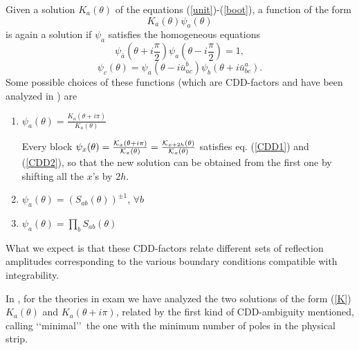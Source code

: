 \documentclass[a4paper,12pt]{report}
\begin{document}
\vspace{0.5cm}

Given a solution $K_{a}(\theta)$ of the equations (\ref{unit})-(\ref{boot}), a function of the form
\begin{equation}
K_{a}(\theta)\psi_{a}(\theta)
\end{equation}
is again a solution if $\psi_{a}$ satisfies the homogeneous equations
\begin{equation}\label{CDD1}
\psi_{\bar{a}}(\theta+i\frac{\pi}{2})\psi_{a}(\theta-i\frac{\pi}{2})=1,
\end{equation}
\begin{equation}\label{CDD2}
\psi_{c}(\theta)=\psi_{a}(\theta-i\bar{u}_{ac}^{b})\psi_{b}(\theta+i\bar{u}_{bc}^{a}).
\end{equation}
Some possible choices of these functions (which are CDD-factors and have been analyzed in \cite{sas}) are

\begin{enumerate}

\item {$\psi_{a}(\theta)=\frac{K_{a}(\theta+i\pi)}{K_{a}(\theta)}$}

Every block $\psi_{x}(\theta)=\frac{{\cal K}_{x}(\theta+i\pi)}{{\cal K}_{x}(\theta)}=\frac{{\cal
K}_{x+2h}(\theta)}{{\cal K}_{x}(\theta)}$ satisfies eq. (\ref{CDD1}) and (\ref{CDD2}), so that the new solution
can be obtained from the first one by shifting all the $x$'s by $2h$.


\item {$\psi_{a}(\theta)=\left(S_{ab}(\theta)\right)^{\pm 1}$, $\forall b$  }

\item {$\psi_{a}(\theta)=\prod_{b}S_{ab}(\theta)$ }


\end{enumerate}
What we expect is that these CDD-factors relate different sets of reflection amplitudes corresponding to the
various boundary conditions compatible with integrability.

\vspace{0.5cm}

In \cite{io}, for the theories in exam we have analyzed the two solutions of the form (\ref{K}) $K_{a}(\theta)$
and $K_{a}(\theta+i\pi)$, related by the first kind of CDD-ambiguity mentioned, calling \lq\lq minimal\rq\rq \,
the one with the minimum number of poles in the physical strip.
\end{document}
